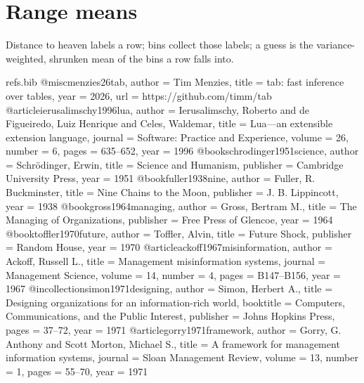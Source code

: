\documentclass[AMA,STIX2COL]{WileyNJD-v2}
\newcommand{\snip}[1]{}
\begin{document}
\snip{Nb}
\snip{NB.like}
\snip{NB.guess}

\section{Range means}

Distance to heaven labels a row; bins collect those labels; a guess
is the variance-weighted, shrunken mean of the bins a row falls into.

\snip{TAB.ydist}
\snip{Rmeans}
\snip{RMEANS.guess}

\nocite{*}


\begin{filecontents}[overwrite]{refs.bib}
@misc{menzies26tab,
  author = {Tim Menzies},
  title  = {tab: fast inference over tables},
  year   = {2026},
  url    = {https://github.com/timm/tab}}
@article{ierusalimschy1996lua,
  author  = {Ierusalimschy, Roberto and de Figueiredo, Luiz Henrique
             and Celes, Waldemar},
  title   = {Lua---an extensible extension language},
  journal = {Software: Practice and Experience},
  volume  = {26}, number = {6}, pages = {635--652}, year = {1996}}
@book{schrodinger1951science,
  author    = {Schr{\"o}dinger, Erwin},
  title     = {Science and Humanism},
  publisher = {Cambridge University Press}, year = {1951}}
@book{fuller1938nine,
  author    = {Fuller, R. Buckminster},
  title     = {Nine Chains to the Moon},
  publisher = {J. B. Lippincott}, year = {1938}}
@book{gross1964managing,
  author    = {Gross, Bertram M.},
  title     = {The Managing of Organizations},
  publisher = {Free Press of Glencoe}, year = {1964}}
@book{toffler1970future,
  author    = {Toffler, Alvin},
  title     = {Future Shock},
  publisher = {Random House}, year = {1970}}
@article{ackoff1967misinformation,
  author  = {Ackoff, Russell L.},
  title   = {Management misinformation systems},
  journal = {Management Science},
  volume  = {14}, number = {4}, pages = {B147--B156}, year = {1967}}
@incollection{simon1971designing,
  author    = {Simon, Herbert A.},
  title     = {Designing organizations for an information-rich world},
  booktitle = {Computers, Communications, and the Public Interest},
  publisher = {Johns Hopkins Press}, pages = {37--72}, year = {1971}}
@article{gorry1971framework,
  author  = {Gorry, G. Anthony and {Scott Morton}, Michael S.},
  title   = {A framework for management information systems},
  journal = {Sloan Management Review},
  volume  = {13}, number = {1}, pages = {55--70}, year = {1971}}
\end{filecontents}
\end{document}
